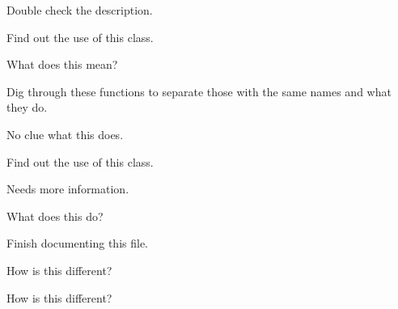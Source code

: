 \begin{DoxyRefList}
%
Double check the description.  
\item[Class \mbox{\hyperlink{classRange}{Range}} ]\label{todo__todo000005}%
%
Find out the use of this class.  
\item[Member \mbox{\hyperlink{LinearAlgebra_8hpp_a24cb3a5296cff6c2f8daf5713380c8c2}{solve\+\_\+continuous\+\_\+lyapunov}} (const Tensor$<$ T, 2 $>$ \&A, const Tensor$<$ T, 2 $>$ \&Q) -\/$>$ Tensor$<$ T, 2 $>$]\label{todo__todo000015}%
%
What does this mean? 
\item[File \mbox{\hyperlink{Sort_8hpp}{Sort.hpp}} ]\label{todo__todo000023}%
%
Dig through these functions to separate those with the same names and what they do.  
\item[File \mbox{\hyperlink{STL_8hpp}{STL.hpp}} ]\label{todo__todo000021}%
%
No clue what this does.  
\item[Class \mbox{\hyperlink{classStride}{Stride}} ]\label{todo__todo000002}%
%
Find out the use of this class.  
\item[Member \mbox{\hyperlink{ElementOperations_8hpp_a79f00e3042f622a53a576bd1ad0c5d88}{sum}} (const Tensor\+Type$<$ T, Rank $>$ \&tensor) -\/$>$ T]\label{todo__todo000033}%
%
Needs more information. 
\item[Member \mbox{\hyperlink{LinearAlgebra_8hpp_a3bd6567b3a485bda3b402c549077b8d0}{sum\+\_\+square}} (const AType$<$ AData\+Type, ARank $>$ \&a, remove\+\_\+complex\+\_\+t$<$ AData\+Type $>$ $\ast$scale, remove\+\_\+complex\+\_\+t$<$ AData\+Type $>$ $\ast$sumsq) -\/$>$ typename std\+::enable\+\_\+if\+\_\+t$<$ is\+\_\+incore\+\_\+rank\+\_\+tensor\+\_\+v$<$ AType$<$ AData\+Type, ARank $>$, 1, AData\+Type $>$$>$]\label{todo__todo000010}%
%
What does this do? 
\item[File \mbox{\hyperlink{Tensor_8hpp}{Tensor.hpp}} ]\label{todo__todo000022}%
%
Finish documenting this file.  
\item[Member \mbox{\hyperlink{LinearAlgebra_8hpp_af6c13f401a077c0e9c9876e115b2df44}{truncated\+\_\+svd}} (const AType$<$ T, ARank $>$ \&\+\_\+A, size\+\_\+t k) -\/$>$ typename std\+::enable\+\_\+if\+\_\+t$<$ is\+\_\+incore\+\_\+rank\+\_\+tensor\+\_\+v$<$ AType$<$ T, ARank $>$, 2, T $>$, std\+::tuple$<$ Tensor$<$ T, 2 $>$, Tensor$<$ remove\+\_\+complex\+\_\+t$<$ T $>$, 1 $>$, Tensor$<$ T, 2 $>$$>$$>$]\label{todo__todo000013}%
%
How is this different? 
\item[Member \mbox{\hyperlink{LinearAlgebra_8hpp_ad5af38d1c8bdeaa3121c37a033ea061b}{truncated\+\_\+syev}} (const AType$<$ T, ARank $>$ \&A, size\+\_\+t k) -\/$>$ typename std\+::enable\+\_\+if\+\_\+t$<$ is\+\_\+incore\+\_\+rank\+\_\+tensor\+\_\+v$<$ AType$<$ T, ARank $>$, 2, T $>$, std\+::tuple$<$ Tensor$<$ T, 2 $>$, Tensor$<$ T, 1 $>$$>$$>$]\label{todo__todo000014}%
%
How is this different?
\end{DoxyRefList}